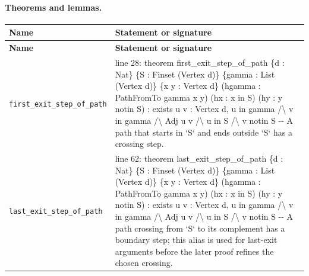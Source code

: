 \documentclass[10pt]{article}
\begin{document}
\paragraph{Theorems and lemmas.}
\begin{longtable}{>{\raggedright\arraybackslash}p{} >{\raggedright\arraybackslash}p{}}
\textbf{Name} & \textbf{Statement or signature} \\
\hline
\endfirsthead
\textbf{Name} & \textbf{Statement or signature} \\
\hline
\endhead
\texttt{first\_\allowbreak{}exit\_\allowbreak{}step\_\allowbreak{}of\_\allowbreak{}path} & {\ttfamily\scriptsize line 28:\allowbreak{} theorem first\_\allowbreak{}exit\_\allowbreak{}step\_\allowbreak{}of\_\allowbreak{}path \{d :\allowbreak{} Nat\} \{S :\allowbreak{} Finset (\allowbreak{}Vertex d)\allowbreak{}\} \{gamma :\allowbreak{} List (\allowbreak{}Vertex d)\allowbreak{}\} \{x y :\allowbreak{} Vertex d\} (\allowbreak{}hgamma :\allowbreak{} PathFromTo gamma x y)\allowbreak{} (\allowbreak{}hx :\allowbreak{} x in S)\allowbreak{} (\allowbreak{}hy :\allowbreak{} y notin S)\allowbreak{} :\allowbreak{} exists u v :\allowbreak{} Vertex d,\allowbreak{} u in gamma /\allowbreak{}\textbackslash{} v in gamma /\allowbreak{}\textbackslash{} Adj u v /\allowbreak{}\textbackslash{} u in S /\allowbreak{}\textbackslash{} v notin S -\allowbreak{}-\allowbreak{} A path that starts in `S` and ends outside `S` has a crossing step.\allowbreak{}} \\[0.45em]
\texttt{last\_\allowbreak{}exit\_\allowbreak{}step\_\allowbreak{}of\_\allowbreak{}path} & {\ttfamily\scriptsize line 62:\allowbreak{} theorem last\_\allowbreak{}exit\_\allowbreak{}step\_\allowbreak{}of\_\allowbreak{}path \{d :\allowbreak{} Nat\} \{S :\allowbreak{} Finset (\allowbreak{}Vertex d)\allowbreak{}\} \{gamma :\allowbreak{} List (\allowbreak{}Vertex d)\allowbreak{}\} \{x y :\allowbreak{} Vertex d\} (\allowbreak{}hgamma :\allowbreak{} PathFromTo gamma x y)\allowbreak{} (\allowbreak{}hx :\allowbreak{} x in S)\allowbreak{} (\allowbreak{}hy :\allowbreak{} y notin S)\allowbreak{} :\allowbreak{} exists u v :\allowbreak{} Vertex d,\allowbreak{} u in gamma /\allowbreak{}\textbackslash{} v in gamma /\allowbreak{}\textbackslash{} Adj u v /\allowbreak{}\textbackslash{} u in S /\allowbreak{}\textbackslash{} v notin S -\allowbreak{}-\allowbreak{} A path crossing from `S` to its complement has a boundary step; this alias is used for last-\allowbreak{}exit arguments before the later proof refines the chosen crossing.\allowbreak{}} \\[0.45em]

\end{longtable}
\end{document}
